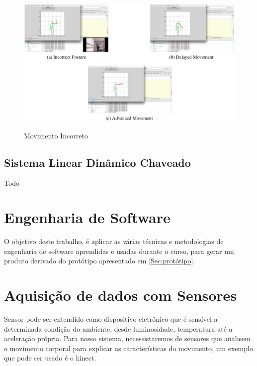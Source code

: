 \begin{figure}[!h]                                                             
\centering                                                                     
\includegraphics [keepaspectratio=true,scale=0.60]{figuras/movimentoIncorreto.eps}
                       
\caption{Movimento Incorreto}                                                     
\cite{roberto}                                                       
\label{movimentoIncorreto}                                                        
\end{figure}                                                                   

\subsection{Sistema Linear Dinâmico Chaveado}

Todo

\section{Engenharia de Software}
\label{Sec:ContextoESW}
  O objetivo deste trabalho, é aplicar as várias técnicas e metodologias de engenharia de software  aprendidas e usadas durante o curso, para gerar um produto derivado do protótipo apresentado em \ref{Sec:protótipo}.
\section{Aquisição de dados com Sensores}
\label{Sec:Aquisição de dados com sensores}

  Sensor pode ser entendido como dispositivo eletrônico que é sensível a determinada
condição do ambiente, desde luminosidade, temperatura até a aceleração própria.
Para nosso sistema, necessistaremos de sensores que analisem o movimento corporal
para explicar as características do movimento, um exemplo que pode ser usado é o
kinect.

